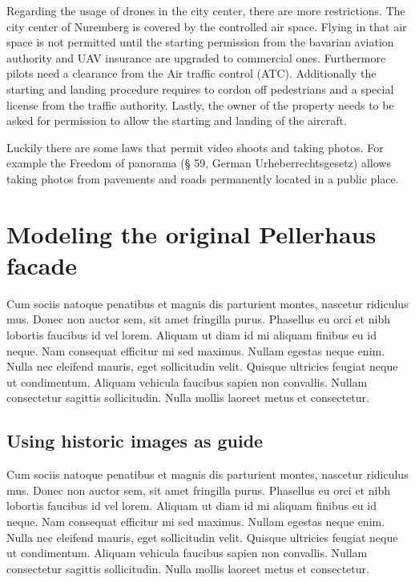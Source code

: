 Regarding the usage of drones in the city center, there are more restrictions. The city center of Nuremberg is covered by the controlled air space. Flying in that air space is not permitted until the starting permission from the bavarian aviation authority and UAV insurance are upgraded to commercial ones. Furthermore pilots need a clearance from the Air traffic control (ATC). Additionally the starting and landing procedure requires to cordon off pedestrians and a special license from the traffic authority. Lastly, the owner of the property needs to be asked for permission to allow the starting and landing of the aircraft.

Luckily there are some laws that permit video shoots and taking photos. For example the Freedom of panorama (§ 59, German Urheberrechtsgesetz) allows taking photos from pavements and roads permanently located in a public place.

\section{Modeling the original Pellerhaus facade}

Cum sociis natoque penatibus et magnis dis parturient montes, nascetur ridiculus mus. Donec non auctor sem, sit amet fringilla purus. Phasellus eu orci et nibh lobortis faucibus id vel lorem. Aliquam ut diam id mi aliquam finibus eu id neque. Nam consequat efficitur mi sed maximus. Nullam egestas neque enim. Nulla nec eleifend mauris, eget sollicitudin velit. Quisque ultricies feugiat neque ut condimentum. Aliquam vehicula faucibus sapien non convallis. Nullam consectetur sagittis sollicitudin. Nulla mollis laoreet metus et consectetur.

\subsection{Using historic images as guide}

Cum sociis natoque penatibus et magnis dis parturient montes, nascetur ridiculus mus. Donec non auctor sem, sit amet fringilla purus. Phasellus eu orci et nibh lobortis faucibus id vel lorem. Aliquam ut diam id mi aliquam finibus eu id neque. Nam consequat efficitur mi sed maximus. Nullam egestas neque enim. Nulla nec eleifend mauris, eget sollicitudin velit. Quisque ultricies feugiat neque ut condimentum. Aliquam vehicula faucibus sapien non convallis. Nullam consectetur sagittis sollicitudin. Nulla mollis laoreet metus et consectetur.

